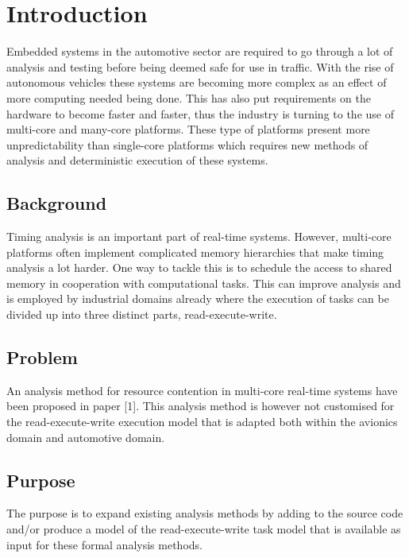 \documentclass{kththesis}
\begin{document}
\mainmatter


\chapter{Introduction} 

Embedded systems in the automotive sector are required to go through a lot of analysis and testing
before being deemed safe for use in traffic. With the rise of autonomous vehicles these systems are
becoming more complex as an effect of more computing needed being done. This has also put
requirements on the hardware to become faster and faster, thus the industry is turning to the use of
multi-core and many-core platforms. These type of platforms present more unpredictability than
single-core platforms which requires new methods of analysis and deterministic execution of these
systems. 


\section{Background} 

Timing analysis is an important part of real-time systems. However, multi-core platforms often
implement complicated memory hierarchies that make timing analysis a lot harder. One way to tackle
this is to schedule the access to shared memory in cooperation with computational tasks. This can
improve analysis and is employed by industrial domains already where the execution of tasks can be
divided up into three distinct parts, read-execute-write.


\section{Problem}

An analysis method for resource contention in multi-core real-time systems have been proposed in
paper [1]. This analysis method is however not customised for the read-execute-write execution model
that is adapted both within the avionics domain and automotive domain.


\section{Purpose}

The purpose is to expand existing analysis methods by adding to the source code and/or produce a
model of the read-execute-write task model that is available as input for these formal analysis
methods.
\end{document}
